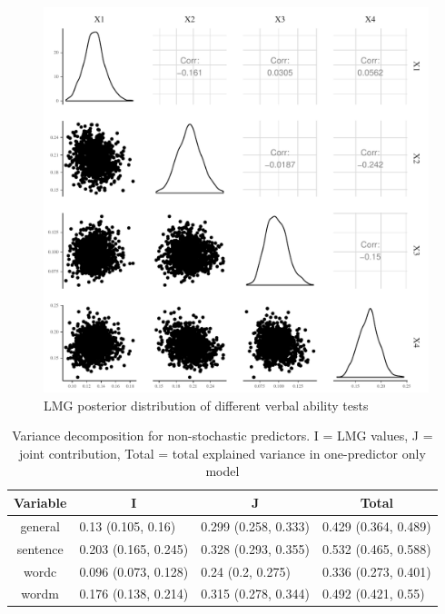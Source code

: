 \documentclass[11pt,a4paper,twoside]{book}\usepackage[]{graphicx}\usepackage[]{color}
\makeatletter
\def\maxwidth{ %
  \ifdim\Gin@nat@width>\linewidth
    \linewidth
  \else
    \Gin@nat@width
  \fi
}
\newenvironment{knitrout}{}{} %
\makeatother
\begin{document}
\begin{knitrout}
\color{fgcolor}\begin{figure}
\includegraphics[width=\maxwidth]{figure/ch03_figempi_lmg_plot-1} \caption[LMG posterior distribution of different verbal ability tests]{LMG posterior distribution of different verbal ability tests}\label{fig:empi.lmg.plot}
\end{figure}


\end{knitrout}


\begin{table}[h]
\caption{Variance decomposition for non-stochastic predictors. I = LMG values, J = joint contribution, Total = total explained variance in one-predictor only model}
\centering
\begin{tabular}{clll}
  \toprule
  \multicolumn{1}{c}{\textbf{Variable}} & \multicolumn{1}{c}{\textbf{I}} &\multicolumn{1}{c}{\textbf{J}} & \multicolumn{1}{c}{\textbf{Total}} \\
  \hline
general & 0.13 (0.105, 0.16)  & 0.299 (0.258, 0.333)   & 0.429 (0.364, 0.489)  \\ 
sentence & 0.203 (0.165, 0.245)  & 0.328 (0.293, 0.355)   & 0.532 (0.465, 0.588)  \\ 
wordc & 0.096 (0.073, 0.128)  & 0.24 (0.2, 0.275)   & 0.336 (0.273, 0.401)  \\ 
wordm & 0.176 (0.138, 0.214)  & 0.315 (0.278, 0.344)   & 0.492 (0.421, 0.55)  \\ 
   \bottomrule
\end{tabular}
\label{tbl:empirical.ijt}
\end{table}
\end{document}
